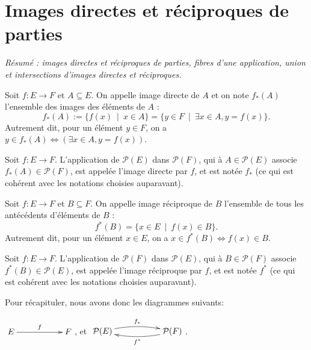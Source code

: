 \section{Images directes et réciproques de parties}





\emph{Résumé : images directes et réciproques de parties, fibres d'une application, union et intersections d'images directes et réciproques.}


\begin{definition}
Soit $f : E\to F$ et $A\subseteq E$. On appelle image directe de $A$ et on note $f_*(A)$ l'ensemble des images des éléments de $A$ :
\[f_*(A) := \{f(x)\:\mid\: x\in A\} = \{y\in F \:\mid\: \exists x\in A, y=f(x)\}.\]
Autrement dit, pour un élément $y\in F$, on a $y\in f_*(A) \iff \left(\exists x\in A, y=f(x)\right)$.
\end{definition}

\begin{definition}
Soit $f : E\to F$. L'application de $\mathcal P(E)$ dans $\mathcal P(F)$, qui à $A\in \mathcal P(E)$ associe $f_*(A)\in \mathcal P(F)$, est appelée \og l'image directe par $f$\fg, et est notée $f_*$ (ce qui est cohérent avec les notations choisies auparavant).
\end{definition}


\begin{definition}
Soit $f : E\to F$ et $B\subseteq F$. On appelle image réciproque de $B$ l'ensemble de tous les antécédents d'éléments de $B$ :
\[f^*(B) = \{x\in E\:\mid\: f(x)\in B \}.\]
Autrement dit, pour un élément $x\in E$, on a $x\in f^*(B) \iff f(x)\in B$.

\end{definition}

\begin{definition}
Soit $f : E\to F$. L'application de $\mathcal P(F)$ dans $\mathcal P(E)$, qui à $B\in \mathcal P(F)$ associe $f^*(B)\in \mathcal P(E)$, est appelée \og l'image réciproque par $f$\fg, et est notée $f^*$ (ce qui est cohérent avec les notations choisies auparavant).
\end{definition}

Pour récapituler, nous avons donc les diagrammes suivants:
\begin{center}
$\xymatrix{E\ar[rr]^{f} & & F}$, et 
$\xymatrix{
\mathcal P(E) \ar@/^/[rr]^{f_*}& & \mathcal P(F) \ar@/^/[ll]^{f^*}
}$.
\end{center}


